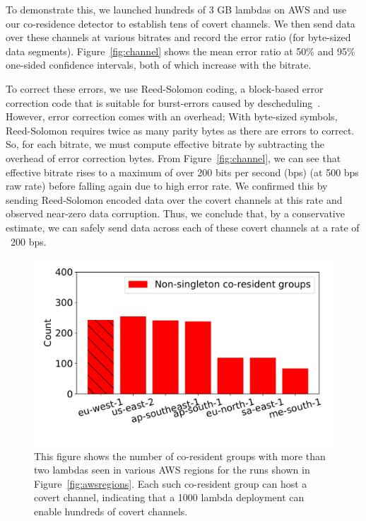 To demonstrate this, we launched hundreds of 3 GB lambdas on AWS and use our
co-residence detector to establish tens of covert channels. We then send data
over these channels at various bitrates and record the error ratio (for
byte-sized data segments). Figure~\ref{fig:channel} shows the mean error ratio
at 50\% and 95\% one-sided confidence intervals, both of which increase with the bitrate.


To correct these errors, we use Reed-Solomon coding, a block-based error correction 
code that is suitable for burst-errors caused by descheduling~\cite{wuusenix2012}. 
However, error correction comes with an overhead; With byte-sized symbols,
Reed-Solomon requires twice as many parity bytes as there are errors to correct. 
So, for each bitrate, we must compute
effective bitrate by subtracting the overhead of error correction bytes.
From Figure~\ref{fig:channel}, we can see that effective bitrate rises to a
maximum of over 200 bits per second (bps) (at 500 bps raw rate) before falling
again due to high error rate. We confirmed this by sending Reed-Solomon encoded
data over the covert channels at this rate and observed near-zero data
corruption. Thus, we conclude that, by a conservative estimate, we can safely
send data across each of these covert channels at a rate of ~200 bps.



\begin{figure}[!t]
  \includegraphics[width=.99\linewidth]{fig/clusters.pdf}
  \caption{This figure shows the number of co-resident groups with more than two lambdas
  seen in various AWS regions for the runs shown in Figure~\ref{fig:awsregions}. 
  Each such co-resident group can host a covert channel, indicating that a 1000 lambda 
  deployment can enable hundreds of covert channels.
\label{fig:clusters}}
\end{figure}


